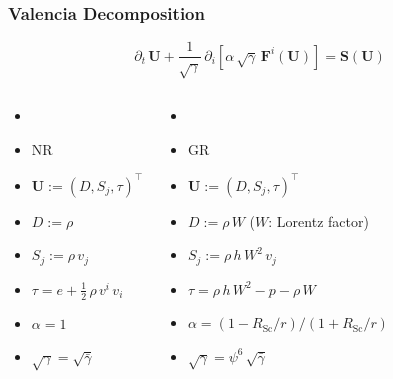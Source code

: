 \documentclass{beamer}
\newcommand{\p}{\partial}
\newcommand{\bs}{\boldsymbol}
\newcommand{\rsc}{R_{\mathrm{Sc}}}
\begin{document}
\begin{frame}
\frametitle{Valencia Decomposition}

  \begin{equation*}
    \p_{t}\,\bs{U}
    +\frac{1}{\sqrt{\gamma}}\,
    \p_{i}\left[\alpha\,\sqrt{\gamma}\,\bs{F}^{i}\left(\bs{U}\right)\right]
    =\bs{S}\left(\bs{U}\right)
  \end{equation*}

  \begin{columns}[c]


      \begin{itemize}[<+->]
        \item[]
        \item[]
          NR
        \item[]
          $\bs{U}:=\left(D,S_{j},\tau\right)^{\top}$
        \item[]
          $D:=\rho$
        \item[]
          $S_{j}:=\rho\,v_{j}$
        \item[]
          $\tau=e+\frac{1}{2}\,\rho\,v^{i}\,v_{i}$
        \item[]
          $\alpha=1$
        \item[]
          $\sqrt{\gamma}=\sqrt{\bar{\gamma}}$
      \end{itemize}


      \begin{itemize}[<+->]
        \item[]
        \item[]
          GR
        \item[]
          $\bs{U}:=\left(D,S_{j},\tau\right)^{\top}$
        \item[]
          $D:=\rho\,W$ ($W$: Lorentz factor)
        \item[]
          $S_{j}:=\rho\,h\,W^{2}\,v_{j}$
        \item[]
          $\tau=\rho\,h\,W^{2}-p-\rho\,W$
        \item[]
          $\alpha=\left(1-\rsc/r\right)/\left(1+\rsc/r\right)$
        \item[]
          $\sqrt{\gamma}=\psi^{6}\,\sqrt{\bar{\gamma}}$
      \end{itemize}

  \end{columns}

\end{frame}
\end{document}
